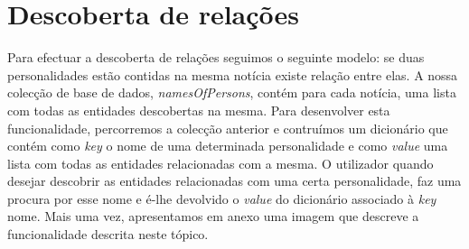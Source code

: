 \section{Descoberta de relações}

Para efectuar a descoberta de relações seguimos o seguinte modelo: se duas personalidades estão contidas na mesma notícia existe relação entre elas.
A nossa colecção de base de dados, \textit{namesOfPersons}, contém para cada notícia, uma lista com todas as entidades descobertas na mesma. Para desenvolver esta funcionalidade, percorremos a colecção anterior e contruímos um dicionário que contém como \textit{key} o nome de uma determinada personalidade e como \textit{value} uma lista com todas as entidades relacionadas com a mesma. O utilizador quando desejar descobrir as entidades relacionadas com uma certa personalidade, faz uma procura por esse nome e é-lhe devolvido o \textit{value} do dicionário associado à \textit{key} nome. Mais uma vez, apresentamos em anexo uma imagem que descreve a funcionalidade descrita neste tópico.
